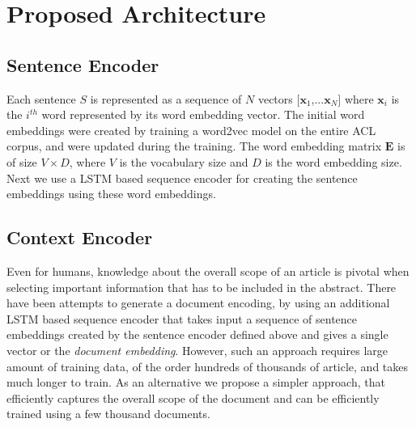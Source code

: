 
\section{Proposed Architecture}



\subsection{Sentence Encoder} 
Each sentence $S$ is represented as a sequence of $N$ vectors $[\boldsymbol{x}_1$,...$\boldsymbol{x}_N]$ where $\boldsymbol{x}_i$ is the $i^{th}$ word represented by its word embedding vector. The initial word embeddings were created by training a word2vec\cite{mikolov2013efficient} model on the entire ACL corpus, and were updated during the training. The word embedding matrix $\boldsymbol{E}$ is of size $V\times D$, where $V$ is the vocabulary size and $D$ is the word embedding size.
Next we use a LSTM based sequence encoder for creating the sentence embeddings using these word embeddings.



\subsection{Context Encoder} Even for humans, knowledge about the overall scope of an article is pivotal when selecting important information that has to be included in the abstract. There have been attempts to generate a document encoding, by using an additional LSTM based sequence encoder that takes input a sequence of sentence embeddings created by the sentence encoder defined above\cite{cheng2016neural} and gives a single vector or the \emph{document embedding}. However, such an approach requires large amount of training data, of the order hundreds of thousands of article, and takes much longer to train. As an alternative we propose a simpler approach, that efficiently captures the overall scope of the document and can be efficiently trained using a few thousand documents.

